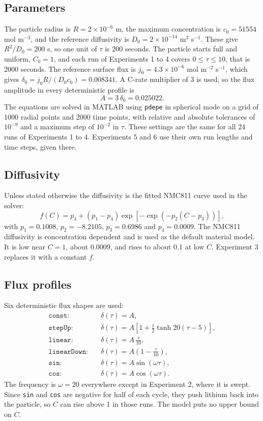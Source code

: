 \documentclass[11pt,a4paper]{article}
\begin{document}
\subsection{Parameters}
The particle radius is $R=2\times10^{-6}$ m, the maximum concentration is $c_0=51554$ mol m$^{-3}$, and the reference diffusivity is $D_0=2\times10^{-14}$ m$^2$ s$^{-1}$. These give $R^2/D_0=200$ s, so one unit of $\tau$ is 200 seconds. The particle starts full and uniform, $C_0=1$, and each run of Experiments 1 to 4 covers $0\le\tau\le10$, that is 2000 seconds. The reference surface flux is $j_0=4.3\times10^{-6}$ mol m$^{-2}$ s$^{-1}$, which gives $\delta_0=j_0R/(D_0c_0)=0.008341$. A C-rate multiplier of 3 is used, so the flux amplitude in every deterministic profile is
\begin{equation}
  A = 3\,\delta_0 = 0.025022.
\end{equation}
The equations are solved in MATLAB using \texttt{pdepe} in spherical mode on a grid of 1000 radial points and 2000 time points, with relative and absolute tolerances of $10^{-9}$ and a maximum step of $10^{-2}$ in $\tau$. These settings are the same for all 24 runs of Experiments 1 to 4. Experiments 5 and 6 use their own run lengths and time steps, given there.

\subsection{Diffusivity}
Unless stated otherwise the diffusivity is the fitted NMC811 curve used in the solver:
\begin{equation}\label{eq:nmc}
  f(C) = p_4 + (p_1-p_4)\exp\left[-\exp\left(-p_2(C-p_3)\right)\right],
\end{equation}
with $p_1=0.1008$, $p_2=-8.2105$, $p_3=0.6986$ and $p_4=0.0009$. The NMC811 diffusivity is concentration dependent and is used as the default material model. It is low near $C=1$, about 0.0009, and rises to about 0.1 at low $C$. Experiment 3 replaces it with a constant $f$.

\subsection{Flux profiles}
Six deterministic flux shapes are used:
\begin{align}
  \texttt{const}:&\quad \delta(\tau)=A,\\
  \texttt{stepUp}:&\quad \delta(\tau)=A\left[1+\tfrac12\tanh 20(\tau-5)\right],\\
  \texttt{linear}:&\quad \delta(\tau)=A\,\frac{\tau}{10},\\
  \texttt{linearDown}:&\quad \delta(\tau)=A\left(1-\frac{\tau}{10}\right),\\
  \texttt{sin}:&\quad \delta(\tau)=A\sin(\omega\tau),\\
  \texttt{cos}:&\quad \delta(\tau)=A\cos(\omega\tau).
\end{align}
The frequency is $\omega=20$ everywhere except in Experiment 2, where it is swept. Since \texttt{sin} and \texttt{cos} are negative for half of each cycle, they push lithium back into the particle, so $C$ can rise above 1 in those runs. The model puts no upper bound on $C$.
\end{document}
